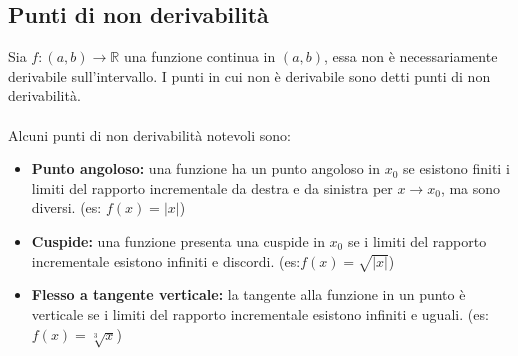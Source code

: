 \documentclass{article}
\begin{document}
\subsection{Punti di non derivabilità}
Sia $f:(a,b)\rightarrow\mathds{R}$ una funzione continua in $(a,b)$, essa non è necessariamente derivabile sull'intervallo. I punti in cui non è derivabile sono detti punti di non derivabilità.\\\\
Alcuni punti di non derivabilità notevoli sono:\begin{itemize}
    \item \textbf{Punto angoloso:} una funzione ha un punto angoloso in $x_0$ se esistono finiti i limiti del rapporto incrementale da destra e da sinistra per $x\rightarrow x_0$, ma sono diversi. (es: $f(x)=|x|$)
    \item \textbf{Cuspide:} una funzione presenta una cuspide in $x_0$ se i limiti del rapporto incrementale esistono infiniti e discordi. (es:$f(x)=\sqrt{|x|}$)
    \item \textbf{Flesso a tangente verticale:} la tangente alla funzione in un punto è verticale se i limiti del rapporto incrementale esistono infiniti e uguali. (es:$f(x)=\sqrt[3]{x}$)
\end{itemize}
\end{document}
